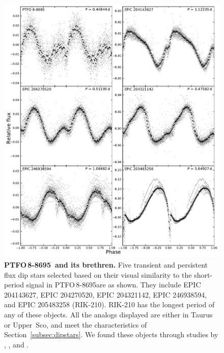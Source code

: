 \documentclass[12pt,twocolumn,tighten]{aastex62}
\newcommand{\ptfo}{PTFO$\,$8-8695}
\begin{document}
\begin{figure}[hbtp]
	\begin{center}
		\leavevmode
		\includegraphics[width=1\textwidth]{f7.pdf}
	\end{center}
	\vspace{-0.7cm}
  \caption{ {\bf \ptfo\ and its brethren.}
    Five transient and persistent flux dip stars selected based on
    their visual similarity to the short-period signal in \ptfo are as
    shown.
    They include
    EPIC 204143627,
    EPIC 204270520,
    EPIC 204321142,
    EPIC 246938594,
    and
    EPIC 205483258 (RIK-210).
    RIK-210 has the longest period of any of these objects. 
    All the analogs displayed are either in Taurus or Upper~Sco, and
    meet the characteristics of Section~\ref{subsec:dipstars}.
    We found these objects through studies by
    \citet{stauffer_orbiting_2017}, \citet{david_transient_2017}, and
    \citet{rebull_usco_2018}.
		\label{fig:brethren}
	}
\end{figure}
\end{document}
